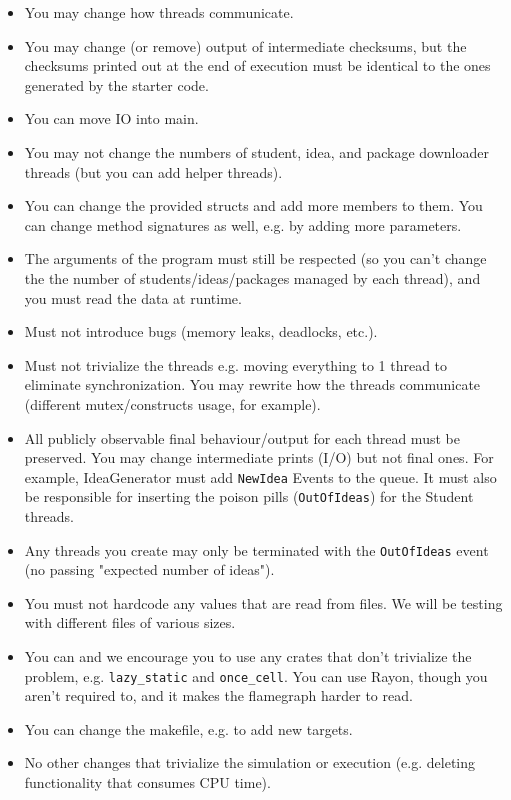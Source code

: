 \begin{itemize}
	\item You may change how threads communicate.
	\item You may change (or remove) output of intermediate checksums, but the checksums printed out at the end of execution must be identical to the ones generated by the starter code.
        \item You can move IO into main.
	\item You may not change the numbers of student, idea, and package downloader threads (but you can add helper threads).
        \item You can change the provided structs and add more members to them. You can change method signatures as well, e.g. by adding more parameters.
	\item The arguments of the program must still be respected (so you can't change the the number of students/ideas/packages managed by each thread), and you must read the data at runtime.
	\item Must not introduce bugs (memory leaks, deadlocks, etc.). 
	\item Must not trivialize the threads e.g. moving everything to 1 thread to eliminate synchronization. You may rewrite how the threads communicate (different mutex/constructs usage, for example).
	\item All publicly observable final behaviour/output for each thread must be preserved.  You may change intermediate prints (I/O) but not final ones. For example, IdeaGenerator must add \texttt{NewIdea} Events to the queue. It must also be responsible for inserting the poison pills (\texttt{OutOfIdeas}) for the Student threads.
	\item Any threads you create may only be terminated with the \texttt{OutOfIdeas} event (no passing "expected number of ideas").
	\item You must not hardcode any values that are read from files. We will be testing with different files of various sizes.
        \item You can and we encourage you to use any crates that don't trivialize the problem, e.g. \texttt{lazy\_static} and \texttt{once\_cell}. You can use Rayon, though you aren't required to, and it makes the flamegraph harder to read.
        \item You can change the makefile, e.g. to add new targets.
	\item No other changes that trivialize the simulation or execution (e.g. deleting functionality that consumes CPU time). 
\end{itemize}

